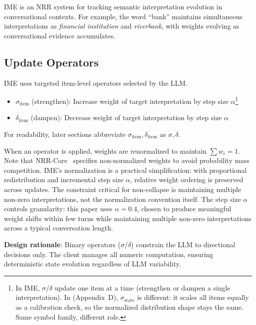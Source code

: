 \documentclass[11pt,a4paper]{article}
\begin{document}
IME is an NRR system for tracking semantic interpretation evolution in
conversational contexts. For example, the word ``bank''
maintains simultaneous interpretations as \textit{financial institution} and
\textit{riverbank}, with weights evolving as conversational evidence accumulates.

\subsection{Update Operators}

IME uses targeted item-level operators selected by the LLM.

\begin{itemize}
    \item $\sigma_{\text{item}}$ (strengthen): Increase weight of target interpretation by step
    size $\alpha$\footnote{In IME, $\sigma$/$\delta$ update one item at a time (strengthen or dampen a single interpretation). In \cite{saito2026phi} (Appendix~D), $\sigma_{\mathrm{state}}$ is different: it scales all items equally as a calibration check, so the normalized distribution shape stays the same. Same symbol family, different role.}
    \item $\delta_{\text{item}}$ (dampen): Decrease weight of target interpretation by step
          size $\alpha$
\end{itemize}

For readability, later sections abbreviate $\sigma_{\text{item}}, \delta_{\text{item}}$ as $\sigma, \delta$.

When an operator is applied, weights are renormalized to maintain $\sum w_i = 1$.
Note that NRR-Core~\cite{saito2025nrr} specifies non-normalized weights to avoid
probability mass competition. IME's normalization is a practical simplification:
with proportional redistribution and incremental step size $\alpha$, relative
weight ordering is preserved across updates. The constraint critical for
non-collapse is maintaining multiple non-zero interpretations, not the
normalization convention itself.
The step size $\alpha$ controls granularity: this paper uses $\alpha = 0.4$,
chosen to produce meaningful weight shifts within few turns while maintaining
multiple non-zero interpretations across a typical conversation length.

\textbf{Design rationale}: Binary operators ($\sigma/\delta$) constrain the LLM to
directional decisions only. The client manages all numeric computation, ensuring
deterministic state evolution regardless of LLM variability.
\end{document}
